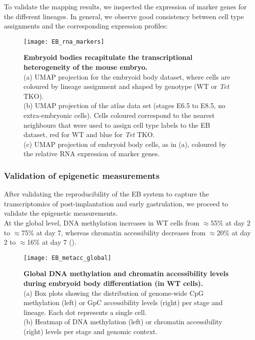 To validate the mapping results, we inspected the expression of marker genes for the different lineages. In general, we observe good consistency between cell type assignments and the corresponding expression profiles:

\begin{figure}[H]
	\centering
	\texttt{[image: EB\_rna\_markers]}
	\caption[]{
	\textbf{Embryoid bodies recapitulate the transcriptional heterogeneity of the mouse embryo.}\\
	(a) UMAP projection for the embryoid body dataset, where cells are coloured by lineage assignment and shaped by genotype (WT or \textit{Tet} TKO).\\
	(b) UMAP projection of the atlas data set (stages E6.5 to E8.5, no extra-embryonic cells). Cells coloured correspond to the nearest neighbours that were used to assign cell type labels to the EB dataset, red for WT and blue for \textit{Tet} TKO.\\
	(c) UMAP projection of embryoid body cells, as in (a), coloured by the relative RNA expression of marker genes. 
	}
	\label{fig:EB_rna_markers}
\end{figure}



\subsubsection{Validation of epigenetic measurements}

After validating the reproducibility of the EB system to capture the transcriptomics of post-implantation and early gastrulation, we proceed to validate the epigenetic measurements.\\
At the global level, DNA methylation increases in WT cells from $\approx$55\% at day 2 to $\approx$75\% at day 7, whereas chromatin accessibility decreases from $\approx$20\% at day 2 to $\approx$16\% at day 7 ().

\begin{figure}[H]
	\centering
	\texttt{[image: EB\_metacc\_global]}
	\caption[]{
	\textbf{Global DNA methylation and chromatin accessibility levels during embryoid body differentiation (in WT cells).}\\
	(a) Box plots showing the distribution of genome-wide CpG methylation (left) or GpC accessibility levels (right) per stage and lineage. Each dot represents a single cell. \\
	(b) Heatmap of DNA methylation (left) or chromatin accessibility (right) levels per stage and genomic context.
	}
	\label{fig:EB_metacc_global}
\end{figure}

